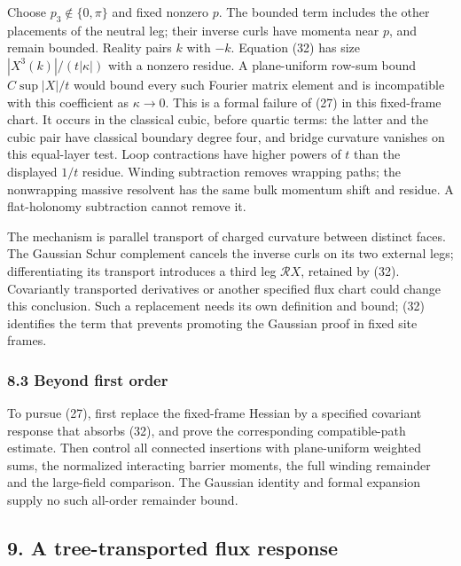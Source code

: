 \documentclass[11pt,a4paper]{article}
\begin{document}
Choose \(p_3\notin\{0,\pi\}\) and fixed nonzero \(p\). The bounded term
includes the other placements of the neutral leg; their inverse curls
have momenta near \(p\), and remain bounded. Reality pairs \(k\) with
\(-k\). Equation (32) has size \(|X^3(k)|/(t|\kappa|)\) with a nonzero
residue. A plane-uniform row-sum bound \(C\sup|X|/t\) would bound every
such Fourier matrix element and is incompatible with this coefficient as
\(\kappa\to0\). This is a formal failure of (27) in this fixed-frame
chart. It occurs in the classical cubic, before quartic terms: the
latter and the cubic pair have classical boundary degree four, and
bridge curvature vanishes on this equal-layer test. Loop contractions
have higher powers of \(t\) than the displayed \(1/t\) residue. Winding
subtraction removes wrapping paths; the nonwrapping massive resolvent
has the same bulk momentum shift and residue. A flat-holonomy
subtraction cannot remove it.

The mechanism is parallel transport of charged curvature between
distinct faces. The Gaussian Schur complement cancels the inverse curls
on its two external legs; differentiating its transport introduces a
third leg \(\mathcal R X\), retained by (32). Covariantly transported
derivatives or another specified flux chart could change this
conclusion. Such a replacement needs its own definition and bound; (32)
identifies the term that prevents promoting the Gaussian proof in fixed
site frames.

\hypertarget{beyond-first-order}{%
\subsubsection{8.3 Beyond first order}\label{beyond-first-order}}

To pursue (27), first replace the fixed-frame Hessian by a specified
covariant response that absorbs (32), and prove the corresponding
compatible-path estimate. Then control all connected insertions with
plane-uniform weighted sums, the normalized interacting barrier moments,
the full winding remainder and the large-field comparison. The Gaussian
identity and formal expansion supply no such all-order remainder bound.

\hypertarget{a-tree-transported-flux-response}{%
\subsection{9. A tree-transported flux
response}\label{a-tree-transported-flux-response}}
\end{document}
